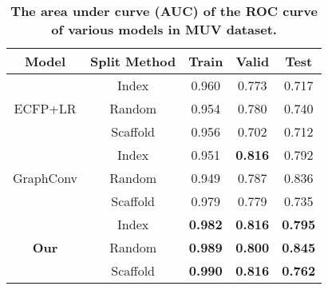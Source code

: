\documentclass[letterpaper]{article} \usepackage{aaai18}  \usepackage{times}  \usepackage{helvet}  \usepackage{courier}  \usepackage{url}  \usepackage{graphicx}  \usepackage{amsmath}
\begin{document}
\begin{table}[!h]
\caption{\textbf{The area under curve (AUC) of the ROC curve of various models in MUV dataset.} }
\label{tbl::muv}
\vskip 0.15in
\begin{center}
\begin{small}
\begin{tabular}{|c|c|c|c|c|}
\hline
Model                           & Split Method    & Train         &Valid         & Test \\
\hline
\multirow{3}{*}{ECFP+LR}        & Index      &   0.960       &   0.773      &   0.717  \\
                                & Random     &   0.954       &   0.780      &   0.740  \\
                                & Scaffold   &   0.956       &   0.702      &   0.712  \\
\hline
\multirow{3}{*}{GraphConv}      & Index      &   0.951       &\textbf{0.816}&   0.792  \\
                                & Random     &   0.949       &   0.787      &   0.836  \\
                                & Scaffold   &   0.979       &   0.779      &   0.735  \\
\hline
\multirow{3}{*}{\textbf{Our}}   & Index      &\textbf{0.982} &\textbf{0.816} &\textbf{0.795}\\
                                & Random     &\textbf{0.989} &\textbf{0.800} &\textbf{0.845}\\
                                & Scaffold   &\textbf{0.990} &\textbf{0.816} &\textbf{0.762}\\  
\hline
\end{tabular}
\end{small}
\end{center}
\vskip -0.1in
\end{table}
\end{document}
